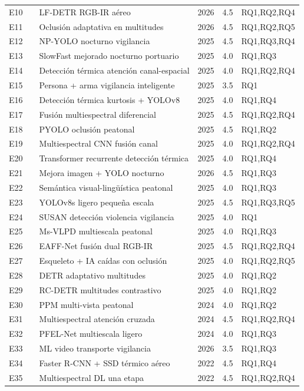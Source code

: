 \documentclass[12pt, a4paper]{article}
\begin{document}
\begin{singlespace}
\begin{longtable}{clp{7.5cm}ccl}
E10 & \cite{E10} & LF-DETR RGB-IR a\'{e}reo & 2026 & 4.5 & RQ1,RQ2,RQ4 \\
E11 & \cite{E11} & Oclusi\'{o}n adaptativa en multitudes & 2026 & 4.5 & RQ1,RQ2,RQ5 \\
E12 & \cite{E12} & NP-YOLO nocturno vigilancia & 2025 & 4.5 & RQ1,RQ3,RQ4 \\
E13 & \cite{E13} & SlowFast mejorado nocturno portuario & 2025 & 4.0 & RQ1,RQ3 \\
E14 & \cite{E14} & Detecci\'{o}n t\'{e}rmica atenci\'{o}n canal-espacial & 2025 & 4.0 & RQ1,RQ2,RQ4 \\
E15 & \cite{E15} & Persona + arma vigilancia inteligente & 2025 & 3.5 & RQ1 \\
E16 & \cite{E16} & Detecci\'{o}n t\'{e}rmica kurtosis + YOLOv8 & 2025 & 4.0 & RQ1,RQ4 \\
E17 & \cite{E17} & Fusi\'{o}n multiespectral diferencial & 2025 & 4.5 & RQ1,RQ2,RQ4 \\
E18 & \cite{E18} & PYOLO oclusi\'{o}n peatonal & 2025 & 4.5 & RQ1,RQ2 \\
E19 & \cite{E19} & Multiespectral CNN fusi\'{o}n canal & 2025 & 4.0 & RQ1,RQ2,RQ4 \\
E20 & \cite{E20} & Transformer recurrente detecci\'{o}n t\'{e}rmica & 2025 & 4.0 & RQ1,RQ4 \\
E21 & \cite{E21} & Mejora imagen + YOLO nocturno & 2026 & 4.5 & RQ1,RQ3 \\
E22 & \cite{E22} & Sem\'{a}ntica visual-ling\"{u}\'{i}stica peatonal & 2025 & 4.0 & RQ1,RQ3 \\
E23 & \cite{E23} & YOLOv8s ligero peque\~{n}a escala & 2025 & 4.5 & RQ1,RQ3,RQ5 \\
E24 & \cite{E24} & SUSAN detecci\'{o}n violencia vigilancia & 2025 & 4.0 & RQ1 \\
E25 & \cite{E25} & Ms-VLPD multiescala peatonal & 2025 & 4.0 & RQ1,RQ3 \\
E26 & \cite{E26} & EAFF-Net fusi\'{o}n dual RGB-IR & 2025 & 4.5 & RQ1,RQ2,RQ4 \\
E27 & \cite{E27} & Esqueleto + IA ca\'{i}das con oclusi\'{o}n & 2025 & 4.0 & RQ1,RQ2,RQ5 \\
E28 & \cite{E28} & DETR adaptativo multitudes & 2025 & 4.0 & RQ1,RQ2 \\
E29 & \cite{E29} & RC-DETR multitudes contrastivo & 2025 & 4.0 & RQ1,RQ2 \\
E30 & \cite{E30} & PPM multi-vista peatonal & 2024 & 4.0 & RQ1,RQ2 \\
E31 & \cite{E31} & Multiespectral atenci\'{o}n cruzada & 2024 & 4.5 & RQ1,RQ2,RQ4 \\
E32 & \cite{E32} & PFEL-Net multiescala ligero & 2024 & 4.0 & RQ1,RQ3 \\
E33 & \cite{E33} & ML video transporte vigilancia & 2026 & 3.5 & RQ1,RQ3 \\
E34 & \cite{E34} & Faster R-CNN + SSD t\'{e}rmico a\'{e}reo & 2022 & 4.5 & RQ1,RQ4 \\
E35 & \cite{E35} & Multiespectral DL una etapa & 2022 & 4.5 & RQ1,RQ2,RQ4 \\
\end{longtable}
\end{singlespace}
\end{document}
